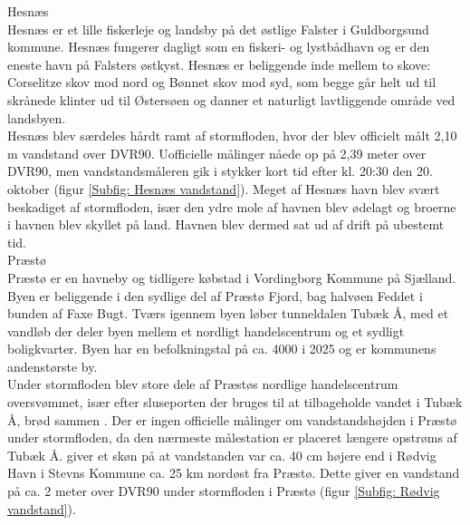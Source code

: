 {\large Hesnæs}\\
Hesnæs er et lille fiskerleje og landsby på det østlige Falster i Guldborgsund kommune. Hesnæs fungerer dagligt som en fiskeri- og lystbådhavn og er den eneste havn på Falsters østkyst. Hesnæs er beliggende inde mellem to skove: Corselitze skov mod nord og Bønnet skov mod syd, som begge går helt ud til skrånede klinter ud til Østersøen og danner et naturligt lavtliggende område ved landsbyen. \\
Hesnæs blev særdeles hårdt ramt af stormfloden, hvor der blev officielt målt 2,10 m vandstand over DVR90. Uofficielle målinger nåede op på 2,39 meter over DVR90, men vandstandsmåleren gik i stykker kort tid efter kl. 20:30 den 20. oktober (figur \ref{Subfig: Hesnæs vandstand}). Meget af Hesnæs havn blev svært beskadiget af stormfloden, især den ydre mole af havnen blev ødelagt og broerne i havnen blev skyllet på land. Havnen blev dermed sat ud af drift på ubestemt tid. \\

{\large Præstø}\\
Præstø er en havneby og tidligere købstad i Vordingborg Kommune på Sjælland. Byen er beliggende i den sydlige del af Præstø Fjord, bag halvøen Feddet i bunden af Faxe Bugt. Tværs igennem byen løber tunneldalen Tubæk Å, med et vandløb der deler byen mellem et nordligt handelscentrum og et sydligt boligkvarter. Byen har en befolkningstal på ca. 4000 i 2025 \citep{danmarks_statistisk_mobile_nodate} og er kommunens andenstørste by. \\
Under stormfloden blev store dele af Præstøs nordlige handelscentrum oversvømmet, især efter sluseporten der bruges til at tilbageholde vandet i Tubæk Å, brød sammen \citep{uldall_sluseport_2023}. Der er ingen officielle målinger om vandstandshøjden i Præstø under stormfloden, da den nærmeste målestation er placeret længere opstrøms af Tubæk Å. \cite{cowi_praesto_2025} giver et skøn på at vandstanden var ca. 40 cm højere end i Rødvig Havn i Stevns Kommune ca. 25 km nordøst fra Præstø. Dette giver en vandstand på ca. 2 meter over DVR90 under stormfloden i Præstø (figur \ref{Subfig: Rødvig vandstand}).